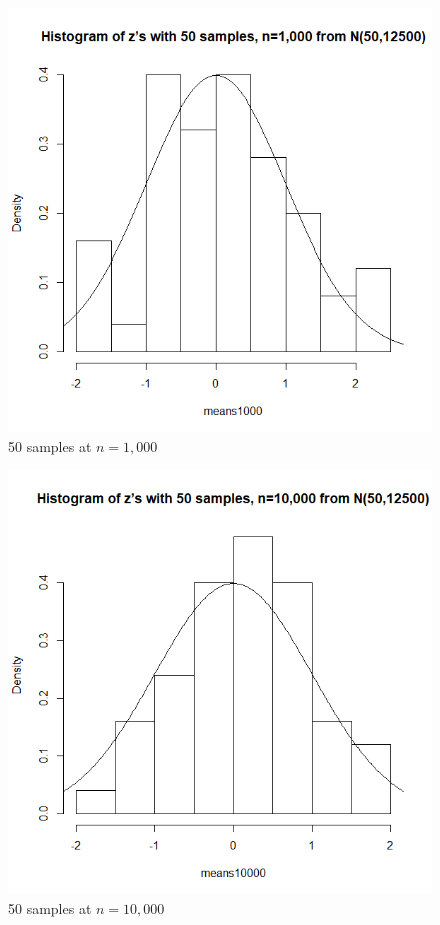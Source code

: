 \documentclass[12pt]{article}
\begin{document}
\begin{figure}[H]
	\centering
	\includegraphics[scale = 0.6]{img/problem6/Problem6_1.png}
	\caption{50 samples at $n = 1,000$}
\end{figure}

\begin{figure}[H]
	\centering
	\includegraphics[scale = 0.6]{img/problem6/Problem6_2.png}
	\caption{50 samples at $n=10,000$}
\end{figure}
\end{document}

